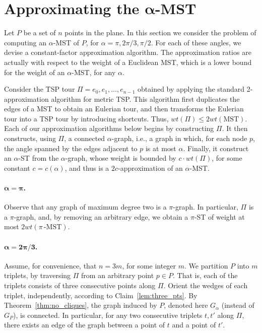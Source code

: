 \documentclass[11pt]{article}
\begin{document}
\section{Approximating the $\boldsymbol{\alpha}$-MST} \label{sec:tsp_apx}
Let $P$ be a set of $n$ points in the plane.
In this section we consider the problem of computing an $\alpha$-MST of $P$, for $\alpha = \pi, 2\pi/3, \pi/2$. For each of these angles, we devise a constant-factor approximation algorithm. The approximation ratios are actually with respect to the weight of a Euclidean MST, which is a lower bound for the weight of an $\alpha$-MST, for any $\alpha$.
 
Consider the TSP tour $\Pi=e_0,e_1,\ldots,e_{n-1}$ obtained by applying the standard 2-approximation algorithm for metric TSP. This algorithm first duplicates the edges of a MST to obtain an Eulerian tour, and then transforms the Eulerian tour into a TSP tour by introducing shortcuts. Thus, $wt(\Pi) \le 2wt(\mbox{MST})$.  
Each of our approximation algorithms below begins by constructing $\Pi$. It then constructs, using $\Pi$, a connected $\alpha$-graph, i.e., a graph in which, for each node $p$, the angle spanned by the edges adjacent to $p$ is at most $\alpha$. Finally, it construct an $\alpha$-ST from the $\alpha$-graph, whose weight is bounded by $c \cdot wt(\Pi)$, for some constant $c=c(\alpha)$, and thus is a $2c$-approximation of an $\alpha$-MST.

\paragraph{$\boldsymbol{\alpha=\pi}$.}
Observe that any graph of maximum degree two is a $\pi$-graph. In particular, $\Pi$ is a $\pi$-graph, and, by removing an arbitrary edge, we obtain a $\pi$-ST of weight at most $2 wt(\pi\!\,\mbox{-MST})$.

\paragraph{$\boldsymbol{\alpha=2\pi/3}$.}
Assume, for convenience, that $n = 3m$, for some integer $m$.
We partition $P$ into $m$ triplets, by traversing $\Pi$ from an arbitrary point $p \in P$.
That is, each of the triplets consists of three consecutive points along $\Pi$.
Orient the wedges of each triplet, independently, according to Claim~\ref{lem:three_pts}.
By Theorem~\ref{thm:no_cliques}, the graph induced by $P$, denoted here $G_{\alpha}$ (instead of $G_P$), is connected. In particular, for any two consecutive triplets $t, t'$ along $\Pi$, there exists an edge of the graph between a point of $t$ and a point of $t'$.
\end{document}
